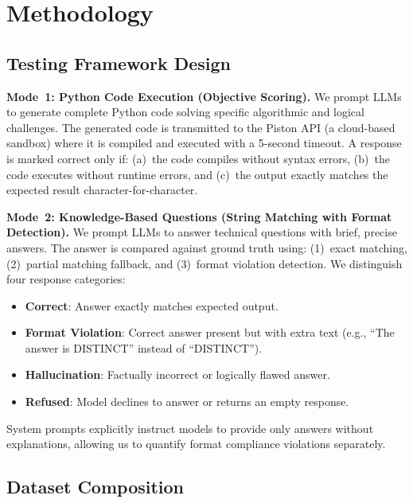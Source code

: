 \documentclass[conference]{IEEEtran}
\begin{document}
\section{Methodology}

\subsection{Testing Framework Design}

\textbf{Mode~1: Python Code Execution (Objective Scoring).}
We prompt LLMs to generate complete Python code solving specific algorithmic and logical challenges. The generated code is transmitted to the Piston API (a cloud-based sandbox) where it is compiled and executed with a 5-second timeout. A response is marked correct only if: (a)~the code compiles without syntax errors, (b)~the code executes without runtime errors, and (c)~the output exactly matches the expected result character-for-character.

\textbf{Mode~2: Knowledge-Based Questions (String Matching with Format Detection).}
We prompt LLMs to answer technical questions with brief, precise answers. The answer is compared against ground truth using: (1)~exact matching, (2)~partial matching fallback, and (3)~format violation detection. We distinguish four response categories:
\begin{itemize}[leftmargin=*]
  \item \textbf{Correct}: Answer exactly matches expected output.
  \item \textbf{Format Violation}: Correct answer present but with extra text (e.g., ``The answer is DISTINCT'' instead of ``DISTINCT'').
  \item \textbf{Hallucination}: Factually incorrect or logically flawed answer.
  \item \textbf{Refused}: Model declines to answer or returns an empty response.
\end{itemize}

System prompts explicitly instruct models to provide only answers without explanations, allowing us to quantify format compliance violations separately.

\subsection{Dataset Composition}
\end{document}
